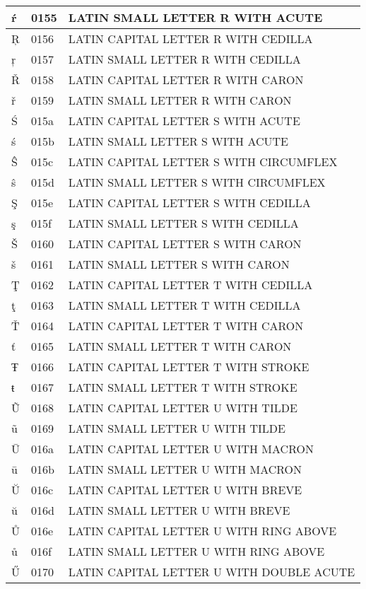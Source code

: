 \documentclass[12pt,letterpaper,openany]{book}
\begin{document}
\begin{center}
\begin{supertabular}{|m{0.25in}|m{0.5in}|m{4in}|}
ŕ & 0155 & LATIN SMALL LETTER R WITH ACUTE\\\hline
Ŗ & 0156 & LATIN CAPITAL LETTER R WITH CEDILLA\\\hline
ŗ & 0157 & LATIN SMALL LETTER R WITH CEDILLA\\\hline
Ř & 0158 & LATIN CAPITAL LETTER R WITH CARON\\\hline
ř & 0159 & LATIN SMALL LETTER R WITH CARON\\\hline
Ś & 015a & LATIN CAPITAL LETTER S WITH ACUTE\\\hline
ś & 015b & LATIN SMALL LETTER S WITH ACUTE\\\hline
Ŝ & 015c & LATIN CAPITAL LETTER S WITH CIRCUMFLEX\\\hline
ŝ & 015d & LATIN SMALL LETTER S WITH CIRCUMFLEX\\\hline
Ş & 015e & LATIN CAPITAL LETTER S WITH CEDILLA\\\hline
ş & 015f & LATIN SMALL LETTER S WITH CEDILLA\\\hline
Š & 0160 & LATIN CAPITAL LETTER S WITH CARON\\\hline
š & 0161 & LATIN SMALL LETTER S WITH CARON\\\hline
Ţ & 0162 & LATIN CAPITAL LETTER T WITH CEDILLA\\\hline
ţ & 0163 & LATIN SMALL LETTER T WITH CEDILLA\\\hline
Ť & 0164 & LATIN CAPITAL LETTER T WITH CARON\\\hline
ť & 0165 & LATIN SMALL LETTER T WITH CARON\\\hline
Ŧ & 0166 & LATIN CAPITAL LETTER T WITH STROKE\\\hline
ŧ & 0167 & LATIN SMALL LETTER T WITH STROKE\\\hline
Ũ & 0168 & LATIN CAPITAL LETTER U WITH TILDE\\\hline
ũ & 0169 & LATIN SMALL LETTER U WITH TILDE\\\hline
Ū & 016a & LATIN CAPITAL LETTER U WITH MACRON\\\hline
ū & 016b & LATIN SMALL LETTER U WITH MACRON\\\hline
Ŭ & 016c & LATIN CAPITAL LETTER U WITH BREVE\\\hline
ŭ & 016d & LATIN SMALL LETTER U WITH BREVE\\\hline
Ů & 016e & LATIN CAPITAL LETTER U WITH RING ABOVE\\\hline
ů & 016f & LATIN SMALL LETTER U WITH RING ABOVE\\\hline
Ű & 0170 & LATIN CAPITAL LETTER U WITH DOUBLE ACUTE\\\hline

\end{supertabular}
\end{center}
\end{document}
